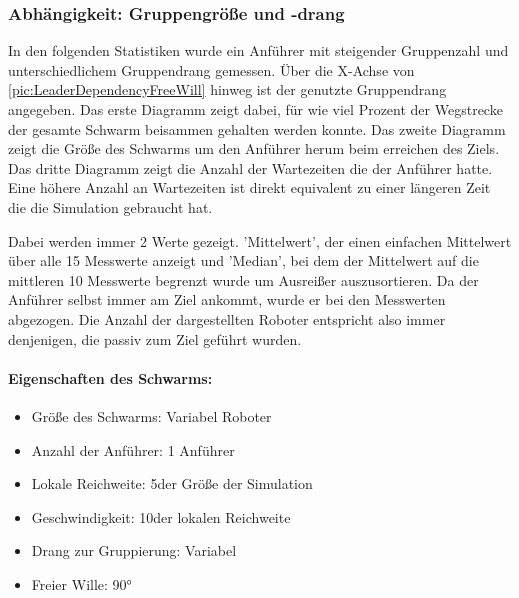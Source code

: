 %
%

\subsubsection*{Abhängigkeit: Gruppengröße und -drang}

In den folgenden Statistiken wurde ein Anführer mit steigender Gruppenzahl und unterschiedlichem Gruppendrang gemessen. Über die X-Achse von \autoref{pic:LeaderDependencyFreeWill} hinweg ist der genutzte Gruppendrang angegeben.
Das erste Diagramm zeigt dabei, für wie viel Prozent der Wegstrecke der gesamte Schwarm beisammen gehalten werden konnte.
Das zweite Diagramm zeigt die Größe des Schwarms um den Anführer herum beim erreichen des Ziels.
Das dritte Diagramm zeigt die Anzahl der Wartezeiten die der Anführer hatte. Eine höhere Anzahl an Wartezeiten ist direkt equivalent zu einer längeren Zeit die die Simulation gebraucht hat.

Dabei werden immer 2 Werte gezeigt. 'Mittelwert', der einen einfachen Mittelwert über alle 15 Messwerte anzeigt und 'Median', bei dem der Mittelwert auf die mittleren 10 Messwerte begrenzt wurde um Ausreißer auszusortieren. Da der Anführer selbst immer am Ziel ankommt, wurde er bei den Messwerten abgezogen. Die Anzahl der dargestellten Roboter entspricht also immer denjenigen, die passiv zum Ziel geführt wurden.

\paragraph*{Eigenschaften des Schwarms:}
\begin{itemize}
	\item Größe des Schwarms: Variabel Roboter
	\item Anzahl der Anführer: 1 Anführer
	\item Lokale Reichweite: 5\per der Größe der Simulation
	\item Geschwindigkeit: 10\per der lokalen Reichweite
	\item Drang zur Gruppierung: Variabel
	\item Freier Wille: 90°
\end{itemize}

